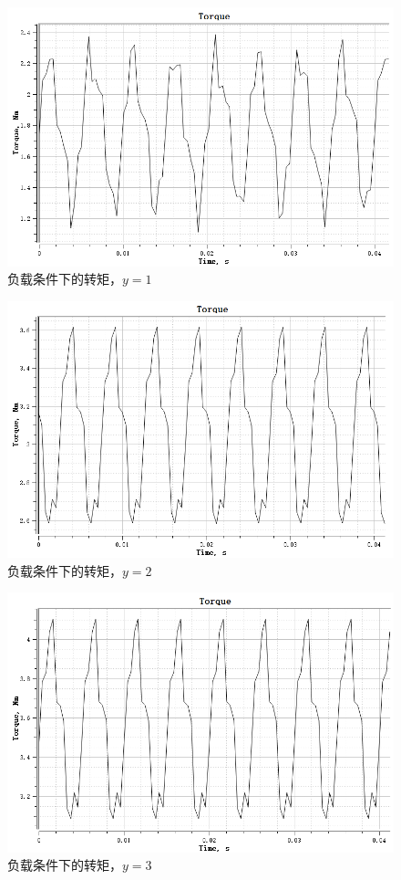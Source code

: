 \documentclass{thuemp}
\begin{document}
\begin{figure}[H]
  \centering
  \includegraphics[width=1\linewidth]{./img/task2/torque-y1-load.png}
  \caption{负载条件下的转矩，$y=1$}
\end{figure}
\begin{figure}[H]
  \centering
  \includegraphics[width=1\linewidth]{./img/task2/torque-y2-load.png}
  \caption{负载条件下的转矩，$y=2$}
\end{figure}
\begin{figure}[H]
  \centering
  \includegraphics[width=1\linewidth]{./img/task2/torque-y3-load.png}
  \caption{负载条件下的转矩，$y=3$}
\end{figure}
\end{document}
